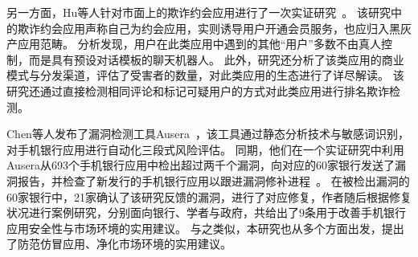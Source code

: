 另一方面，Hu等人针对市面上的欺诈约会应用进行了一次实证研究~\cite{hu2019dating}。
该研究中的欺诈约会应用声称自己为约会应用，实则诱导用户开通会员服务，也应归入黑灰产应用范畴。
分析发现，用户在此类应用中遇到的其他``用户''多数不由真人控制，而是具有预设对话模板的聊天机器人。
此外，研究还分析了该类应用的商业模式与分发渠道，评估了受害者的数量，对此类应用的生态进行了详尽解读。
该研究还通过直接检测相同评论和标记可疑用户的方式对此类应用进行排名欺诈检测。

Chen等人发布了漏洞检测工具Ausera~\cite{chen2018ausera}，该工具通过静态分析技术与敏感词识别，对手机银行应用进行自动化三段式风险评估。
同期，他们在一个实证研究中利用Ausera从693个手机银行应用中检出超过两千个漏洞，向对应的60家银行发送了漏洞报告，并检查了新发行的手机银行应用以跟进漏洞修补进程~\cite{chen2018mobile}。
在被检出漏洞的60家银行中，21家确认了该研究反馈的漏洞，进行了对应修复，作者随后根据修复状况进行案例研究，分别面向银行、学者与政府，共给出了9条用于改善手机银行应用安全性与市场环境的实用建议。
与之类似，本研究也从多个方面出发，提出了防范仿冒应用、净化市场环境的实用建议。




